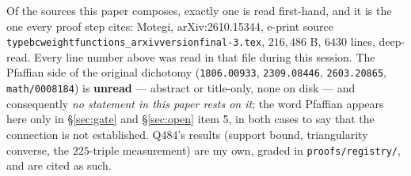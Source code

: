 \documentclass[11pt]{article}
\theoremstyle{plain}
\theoremstyle{definition}
\theoremstyle{remark}
\theoremstyle{plain}
\begin{document}
Of the sources this paper composes, exactly one is read first-hand, and it is
the one every proof step cites: Motegi, arXiv:2610.15344, e-print source
\texttt{typebcweightfunctions\_arxivversionfinal-3.tex}, $216{,}486$ B, $6430$
lines, deep-read.  Every line number above was read in that file during this
session.  The Pfaffian side of the original dichotomy
(\texttt{1806.00933}, \texttt{2309.08446}, \texttt{2603.20865},
\texttt{math/0008184}) is \textbf{unread} --- abstract or title-only, none on
disk --- and consequently \emph{no statement in this paper rests on it}; the
word Pfaffian appears here only in \S\ref{sec:gate} and
\S\ref{sec:open} item 5, in both cases to say that the connection is not
established.  Q484's results (support bound, triangularity converse,
the $225$-triple measurement) are my own, graded in
\texttt{proofs/registry/}, and are cited as such.
\end{document}
